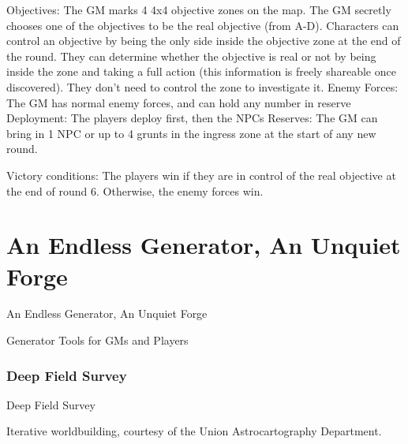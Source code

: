 Objectives: The GM marks 4 4x4 objective zones on the map. The GM secretly chooses one of
the objectives to be the real objective (from A-D). Characters can control an objective by being the
only side inside the objective zone at the end of the round. They can determine whether the
objective is real or not by being inside the zone and taking a full action (this information is freely
shareable once discovered). They don’t need to control the zone to investigate it.
Enemy Forces: The GM has normal enemy forces, and can hold any number in reserve
Deployment: The players deploy first, then the NPCs
Reserves: The GM can bring in 1 NPC or up to 4 grunts in the ingress zone at the start of any
new round.




Victory conditions: The players win if they are in control of the real objective at the end of round
6. Otherwise, the enemy forces win.

\chapter{An Endless Generator, An Unquiet Forge}

An Endless Generator, An Unquiet Forge

Generator Tools for GMs and Players

\subsection{Deep Field Survey }

Deep Field Survey

Iterative worldbuilding, courtesy of the Union Astrocartography Department.

